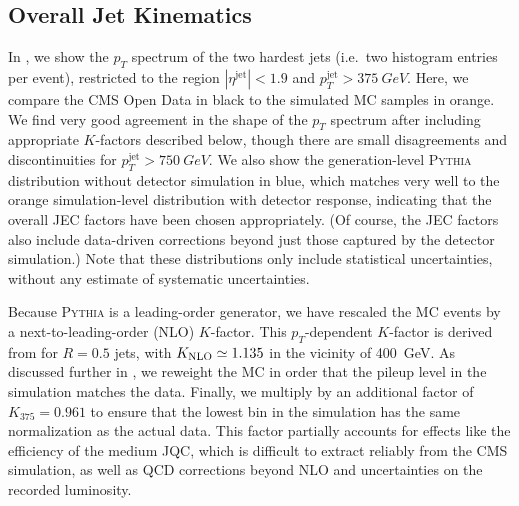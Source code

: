 \documentclass[aps,prd,twocolumn,preprintnumbers,nofootinbib,longbibliography,floatfix,superscriptaddress]{revtex4-1}
\begin{document}
\subsection{Overall Jet Kinematics}
\label{subsec:overalljet}


In , we show the $p_T$ spectrum of the two hardest jets  (i.e.~two histogram entries per event), restricted to the region $|\eta^\text{jet}| < 1.9$ and $p_T^\text{jet} > \SI{375}{GeV}$.
%
Here, we compare the CMS Open Data in black to the simulated MC samples in orange.
%
We find very good agreement in the shape of the $p_T$ spectrum after including appropriate $K$-factors described below, though there are small disagreements and discontinuities for $p_T^\text{jet} > \SI{750}{GeV}$.
%
We also show the generation-level \textsc{Pythia} distribution without detector simulation in blue, which matches very well to the orange simulation-level distribution with detector response, indicating that the overall JEC factors have been chosen appropriately.
%
(Of course, the JEC factors also include data-driven corrections beyond just those captured by the detector simulation.)
%
Note that these distributions only include statistical uncertainties, without any estimate of systematic uncertainties.


Because \textsc{Pythia} is a leading-order generator, we have rescaled the MC events by a next-to-leading-order (NLO) $K$-factor.
%
This $p_T$-dependent $K$-factor is derived from  for $R = 0.5$ jets, with $K_{\rm NLO} \simeq 1.135$ in the vicinity of \SI{400}{GeV}.
%
As discussed further in , we reweight the MC in order that the pileup level in the simulation matches the data.
%
Finally, we multiply by an additional factor of $K_{375} = 0.961$ to ensure that the lowest bin in the simulation has the same normalization as the actual data.
%
This factor partially accounts for effects like the efficiency of the medium JQC, which is difficult to extract reliably from the CMS simulation, as well as QCD corrections beyond NLO and uncertainties on the recorded luminosity.
\end{document}
